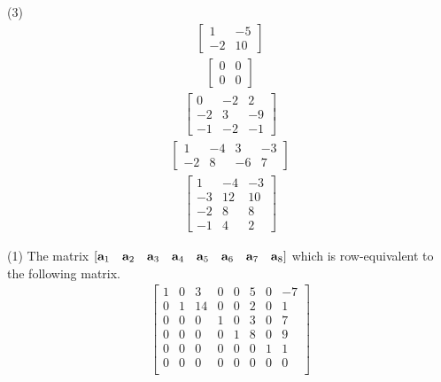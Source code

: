 \begin{tasks}[resume, style=enumerate](3)
\task
  \begin{align*}
    \begin{bmatrix}
      1 & -5 \\
      -2 & 10
    \end{bmatrix}
  \end{align*}
\task
  \begin{align*}
    \begin{bmatrix}
      0 & 0 \\
      0 & 0
    \end{bmatrix}
  \end{align*}
\task
  \begin{align*}
    \begin{bmatrix}
      0 & -2 & 2 \\
      -2 & 3 & -9 \\
      -1 & -2 & -1
    \end{bmatrix}
  \end{align*}
\task
  \begin{align*}
    \begin{bmatrix}
      1 & -4 & 3 & -3 \\
      -2 & 8 & -6 & 7
    \end{bmatrix}
  \end{align*}
\task
  \begin{align*}
    \begin{bmatrix}
      1 & -4 & -3 \\
      -3 & 12 & 10 \\
      -2 & 8 & 8 \\
      -1 & 4 & 2
    \end{bmatrix}
  \end{align*}
\end{tasks}
\begin{tasks}[resume, style=enumerate](1)
\task
  The matrix $[ \va_1 \ \ \ \va_2 \ \ \ \va_3 \ \ \ \va_4 \ \ \ \va_5
    \ \ \ \va_6 \ \ \ \va_7 \ \ \ \va_8 ]$ which is row-equivalent to
  the following matrix.
  \begin{align*}
    \begin{bmatrix}
      1 & 0 & 3 & 0 & 0 & 5 & 0 & -7 \\
      0 & 1 & 14 & 0 & 0 & 2 & 0 & 1 \\
      0 & 0  & 0  & 1 & 0 & 3 & 0 & 7 \\
      0 & 0  & 0  & 0 & 1 & 8 & 0 & 9 \\
      0 & 0  & 0  & 0 & 0 & 0 & 1 & 1 \\
      0 & 0  & 0  & 0 & 0 & 0 & 0 & 0 \\
    \end{bmatrix}
  \end{align*}
\task \faCalculator
  
\end{tasks}
